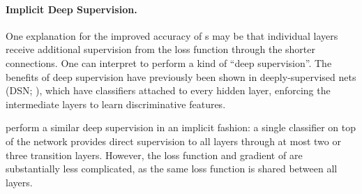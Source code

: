 


\vspace{-2ex}
\paragraph{Implicit Deep Supervision.}
One explanation for the improved accuracy of \methodname{}s may be that individual layers receive additional supervision from the loss function through the shorter connections. One can interpret \methodnameshorts{} to perform a kind of ``deep supervision''. The benefits of deep supervision have previously been shown in deeply-supervised nets (DSN; \cite{dsn}), which have classifiers attached to every hidden layer, enforcing the intermediate layers to learn discriminative features.

\methodnameshorts{} perform a similar deep supervision in an implicit fashion: a single classifier on top of the network provides direct supervision to all layers through at most two or three transition layers. However, the loss function and gradient of \methodnameshorts{} are substantially less complicated, as the same loss function is shared between all layers.


